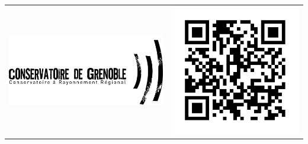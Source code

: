 \begin{titlepage}

\begin{bigcenter}


\begin{tabular}{lr}
  \begin{minipage}{0.75\linewidth}
    \vspace{0.0mm}
    \includegraphics[width=0.9\linewidth]{logo_crr.jpg}
  \end{minipage}
  &
  \begin{minipage}{0.25\linewidth}
    \vspace{6.5mm}
    \includegraphics[width=0.9\linewidth]{qr-cover.pdf}
  \end{minipage}
\end{tabular}


\end{bigcenter}
\end{titlepage}
